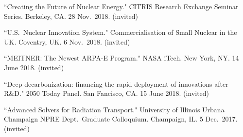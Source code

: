 \begin{bibsection}

\item ``Creating the Future of Nuclear Energy." CITRIS Research Exchange Seminar Series. Berkeley, CA. 28 Nov.\ 2018. (invited)



\item ``U.S.\ Nuclear Innovation System." Commercialisation of Small Nuclear in the UK. Coventry, UK. 6 Nov.\ 2018. (invited)

\item ``MEITNER: The Newest ARPA-E Program." NASA iTech. New York, NY. 14 June 2018. (invited)

\item ``Deep decarbonization: financing the rapid deployment of innovations after R\&D." 2050 Today Panel. San Fancisco, CA. 15 June 2018. (invited)




\item ``Advanced Solvers for Radiation Transport." University of Illinois Urbana Champaign NPRE Dept.\ Graduate Colloquium. Champaign, IL. 5 Dec.\ 2017. (invited)



\end{bibsection}

